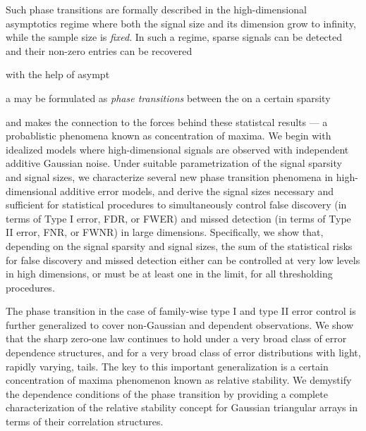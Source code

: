 Such phase transitions are formally described in the high-dimensional asymptotics regime where both the signal size and its dimension 
grow to infinity, while the sample size is {\em fixed}.   In such a regime, sparse signals can be detected and their non-zero entries can be 
recovered 

  with the help of asympt

 a  may be formulated as
{\em phase transitions} between the on a certain sparsity

  and makes the connection to the forces behind these statistcal results --- a probablistic phenomena known as concentration of maxima.
We begin with idealized models where high-dimensional signals are observed with independent additive Gaussian noise.
Under suitable parametrization of the signal sparsity and signal sizes, 
we characterize several new phase transition phenomena in high-dimensional additive error models, and derive the signal sizes necessary and sufficient for statistical procedures to simultaneously control false discovery (in terms of Type I error, {FDR}, or {FWER}) and missed detection (in terms of Type II error, {FNR}, or {FWNR}) in large dimensions.
Specifically, we show that, depending on the signal sparsity and signal sizes, the sum of the statistical risks for false discovery  and missed detection either can be controlled at very low levels in high dimensions, or must be at least one in the limit, for all thresholding procedures.

The phase transition in the case of family-wise type I and type II error control is further generalized to cover non-Gaussian and dependent observations.
We show that the sharp zero-one law continues to hold under a very broad class of error dependence structures, and for a very broad class of error distributions with light, rapidly varying, tails.
The key to this important generalization is a certain {concentration of maxima} phenomenon known as relative stability. 
We demystify the dependence conditions of the phase transition by providing a complete characterization of the relative stability concept for Gaussian triangular arrays in terms of their correlation structures.

